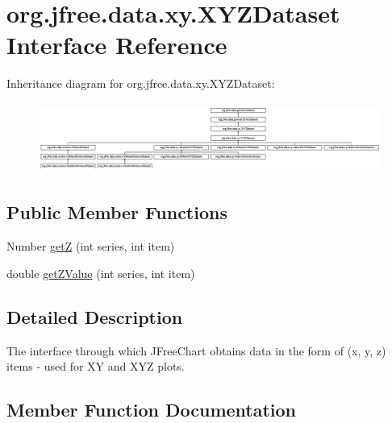 \hypertarget{interfaceorg_1_1jfree_1_1data_1_1xy_1_1_x_y_z_dataset}{}\section{org.\+jfree.\+data.\+xy.\+X\+Y\+Z\+Dataset Interface Reference}
\label{interfaceorg_1_1jfree_1_1data_1_1xy_1_1_x_y_z_dataset}
Inheritance diagram for org.\+jfree.\+data.\+xy.\+X\+Y\+Z\+Dataset\+:\begin{figure}[H]
\begin{center}
\leavevmode
\includegraphics[height=2.316785cm]{interfaceorg_1_1jfree_1_1data_1_1xy_1_1_x_y_z_dataset}
\end{center}
\end{figure}
\subsection*{Public Member Functions}
\begin{DoxyCompactItemize}
\item 
Number \mbox{\hyperlink{interfaceorg_1_1jfree_1_1data_1_1xy_1_1_x_y_z_dataset_a6a6e1c88cc1ca7cfa31c2fa043521c8a}{getZ}} (int series, int item)
\item 
double \mbox{\hyperlink{interfaceorg_1_1jfree_1_1data_1_1xy_1_1_x_y_z_dataset_a2aed0d6b0bbf979643691fc932efa2bc}{get\+Z\+Value}} (int series, int item)
\end{DoxyCompactItemize}


\subsection{Detailed Description}
The interface through which J\+Free\+Chart obtains data in the form of (x, y, z) items -\/ used for XY and X\+YZ plots. 

\subsection{Member Function Documentation}
\mbox{\label{interfaceorg_1_1jfree_1_1data_1_1xy_1_1_x_y_z_dataset_a6a6e1c88cc1ca7cfa31c2fa043521c8a}} 
